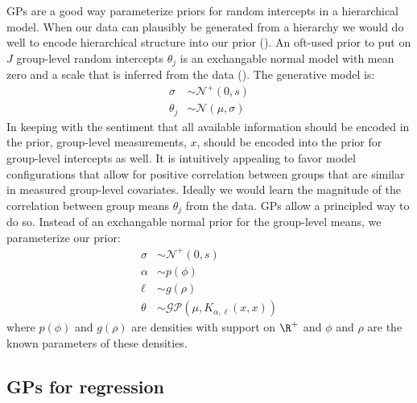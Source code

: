 \documentclass{article}
\begin{document}
GPs are a good way parameterize priors for random intercepts in a hierarchical
model. When our data can plausibly be generated from a hierarchy we would do
well to encode hierarchical structure into our prior (\citet{}). An
oft-used prior to put on $J$ group-level random intercepts $\theta_j$ is
an exchangable normal model with mean zero and a scale that is inferred from
the data (\citep{Gelman+etal+BDA3:2013}). The generative model is: 
%
\begin{align*}
  \sigma & \sim \mathcal{N}^+(0, s) \\
  \theta_j & \sim \mathcal{N}(\mu, \sigma)
\end{align*}
%
In keeping with the sentiment that all available information should be encoded
in the prior, group-level measurements, $x$, should be encoded into the prior for
group-level intercepts as well. It is intuitively appealing to favor model
configurations that allow for positive correlation between groups that are
similar in measured group-level covariates. Ideally we would learn the 
magnitude of the correlation between group means $\theta_j$ from the
data. GPs allow a principled way to do so. Instead of an exchangable normal
prior for the group-level means, we parameterize our prior:
%
\begin{align*}
  \sigma & \sim \mathcal{N}^+(0, s) \\
  \alpha & \sim p(\phi) \\
  \ell & \sim g(\rho) \\
  \theta & \sim \mathcal{GP}(\mu, K_{\alpha, \ell}(x, x))
\end{align*}
%
where $p(\phi)$ and $g(\rho)$ are densities with support on $\R^+$ and $\phi$
and $\rho$ are the known parameters of these densities.

\subsection{GPs for regression}
\end{document}
